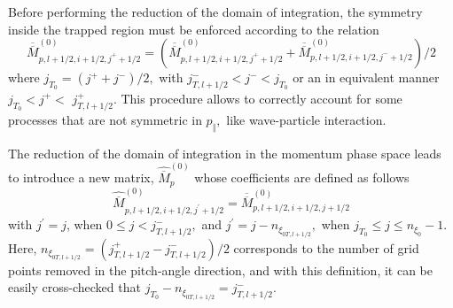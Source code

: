 Before performing the reduction of the domain of integration, the symmetry
inside the trapped region must be enforced according to the relation
\begin{equation}
\overline{\overline{M}}_{p,l+1/2,i+1/2,j^{+}+1/2}^{\left( 0\right) }=\left(
\overline{\overline{M}}_{p,l+1/2,i+1/2,j^{+}+1/2}^{\left( 0\right) }+%
\overline{\overline{M}}_{p,l+1/2,i+1/2,j^{-}+1/2}^{\left( 0\right) }\right)
/2
\end{equation}
where $j_{T_{0}}=\left( j^{+}+j^{-}\right) /2,$ with $
j_{T,l+1/2}^{-}<j^{-}<j_{T_{0}}$ or an in equivalent manner $%
j_{T_{0}}<j^{+}< $ $j_{T,l+1/2}^{+}.$ This procedure allows to correctly
account for some processes that are not symmetric in $p_{\Vert },$ like
wave-particle interaction.

The reduction of the domain of integration in the momentum phase space leads
to introduce a new matrix, $\widehat{\overline{M}}_{p}^{\left( 0\right) }$
whose coefficients are defined as follows
\begin{equation}
\widehat{\overline{M}}_{p,l+1/2,i+1/2,j^{\prime }+1/2}^{\left( 0\right) }=%
\overline{\overline{M}}_{p,l+1/2,i+1/2,j+1/2}^{\left( 0\right) }
\end{equation}
with $j^{\prime }=j$, when $0\leq j<j_{T,l+1/2}^{-},$ and $j^{\prime
}=j-n_{\xi _{0T,l+1/2}},$ when $j_{T_{0}}\leq j\leq n_{\xi _{0}}-1$. Here, $%
n_{\xi _{0T,l+1/2}}=\left( j_{T,l+1/2}^{+}-j_{T,l+1/2}^{-}\right) /2$
corresponds to the number of grid points removed in the pitch-angle
direction, and with this definition, it can be easily cross-checked that $%
j_{T_{0}}-n_{\xi _{0T,l+1/2}}=j_{T,l+1/2}^{-}.$

%

